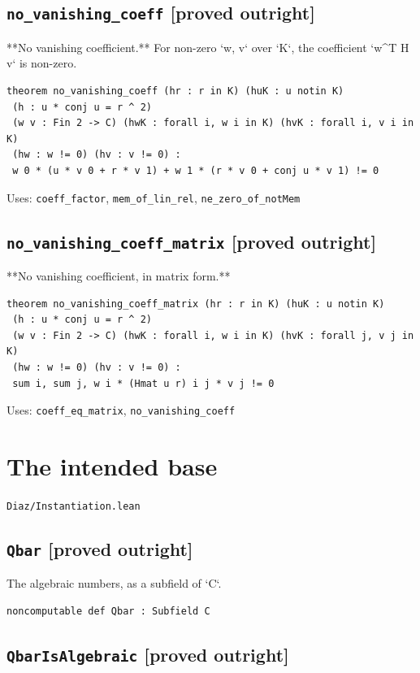 \documentclass[11pt,a4paper]{article}
\newcommand{\tagpr}{\textcolor{provedc}{\textbf{[proved outright]}}}
\begin{document}
\subsection*{\texttt{no\_vanishing\_coeff} \hfill \tagpr}

**No vanishing coefficient.** For non-zero `w, v` over `K`, the coefficient `w\^{}T H v` is non-zero.

\begin{lstlisting}
theorem no_vanishing_coeff (hr : r in K) (huK : u notin K)
 (h : u * conj u = r ^ 2)
 (w v : Fin 2 -> C) (hwK : forall i, w i in K) (hvK : forall i, v i in K)
 (hw : w != 0) (hv : v != 0) :
 w 0 * (u * v 0 + r * v 1) + w 1 * (r * v 0 + conj u * v 1) != 0
\end{lstlisting}
\noindent\footnotesize Uses: \texttt{coeff\_factor}, \texttt{mem\_of\_lin\_rel}, \texttt{ne\_zero\_of\_notMem}\normalsize


\subsection*{\texttt{no\_vanishing\_coeff\_matrix} \hfill \tagpr}

**No vanishing coefficient, in matrix form.**

\begin{lstlisting}
theorem no_vanishing_coeff_matrix (hr : r in K) (huK : u notin K)
 (h : u * conj u = r ^ 2)
 (w v : Fin 2 -> C) (hwK : forall i, w i in K) (hvK : forall j, v j in K)
 (hw : w != 0) (hv : v != 0) :
 sum i, sum j, w i * (Hmat u r) i j * v j != 0
\end{lstlisting}
\noindent\footnotesize Uses: \texttt{coeff\_eq\_matrix}, \texttt{no\_vanishing\_coeff}\normalsize


\section{The intended base}
\noindent\texttt{Diaz/Instantiation.lean}


\subsection*{\texttt{Qbar} \hfill \tagpr}

The algebraic numbers, as a subfield of `C`.

\begin{lstlisting}
noncomputable def Qbar : Subfield C
\end{lstlisting}

\subsection*{\texttt{QbarIsAlgebraic} \hfill \tagpr}
\end{document}
